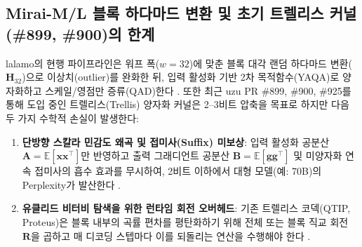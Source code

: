 \documentclass[10pt,a4paper]{article}
\begin{document}
\subsection{\textsf{Mirai-M/L} 블록 하다마드 변환 및 초기 트렐리스 커널(\#899, \#900)의 한계}
\textsf{lalamo}의 현행 파이프라인은 워프 폭($w=32$)에 맞춘 블록 대각 랜덤 하다마드 변환($\mathbf{H}_{32}$)으로 이상치(outlier)를 완화한 뒤, 입력 활성화 기반 2차 목적함수(YAQA)로 양자화하고 스케일/영점만 증류(QAD)한다 \cite{mirai2026quant}. 또한 최근 \textsf{uzu} PR \#899, \#900, \#925를 통해 도입 중인 트렐리스(Trellis) 양자화 커널은 2--3비트 압축을 목표로 하지만 다음 두 가지 수학적 손실이 발생한다:
\begin{enumerate}\setlength{\itemsep}{2pt}\setlength{\parskip}{0pt}
  \item \textbf{단방향 스칼라 민감도 왜곡 및 접미사(Suffix) 미보상}: 입력 활성화 공분산 $\mathbf{A} = \mathbb{E}[\mathbf{x}\mathbf{x}^\top]$만 반영하고 출력 그래디언트 공분산 $\mathbf{B} = \mathbb{E}[\mathbf{g}\mathbf{g}^\top]$ 및 미양자화 연속 접미사의 흡수 효과를 무시하여, 2비트 이하에서 대형 모델(예: 70B)의 Perplexity가 발산한다 \cite{lee2026kronq,lee2026schurquant,yoshida2026casa}.
  \item \textbf{유클리드 비터비 탐색을 위한 런타임 회전 오버헤드}: 기존 트렐리스 코덱(QTIP, Proteus)은 블록 내부의 곡률 편차를 평탄화하기 위해 전체 또는 블록 직교 회전 $\mathbf{R}$을 곱하고 매 디코딩 스텝마다 이를 되돌리는 연산을 수행해야 한다 \cite{ding2026curvetq}.
\end{enumerate}
\end{document}
